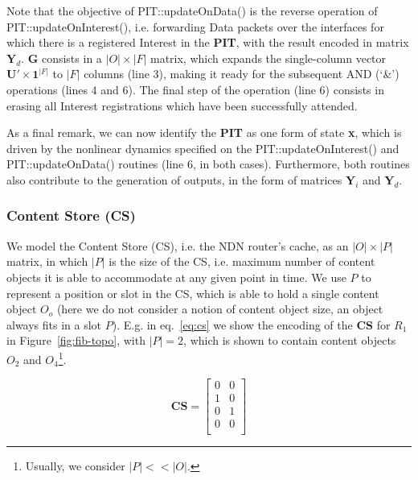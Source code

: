 Note that 
the objective of PIT::updateOnData() is the reverse operation of PIT::updateOnInterest(), i.e. forwarding Data 
packets over the interfaces for which there is a registered Interest in the \textbf{PIT}, with 
the result encoded in matrix $\textbf{Y}_d$. $\textbf{G}$ consists in a $|O| \times |F|$ matrix, which expands the single-column 
vector $\textbf{U}' \times \textbf{1}^{|F|}$ to $|F|$ columns (line 3), making it ready 
for the subsequent AND (`\&') operations (lines 4 and 6). The final 
step of the operation (line 6) consists in erasing 
all Interest registrations which have been successfully attended.\shortvertbreak

As a final remark, we can now identify the \textbf{PIT} as one form of state 
\textbf{x}, which is driven by the nonlinear dynamics specified on the 
PIT::updateOnInterest() and PIT::updateOnData() routines (line 6, in both cases). 
Furthermore, both routines also contribute to the generation of outputs, 
in the form of matrices $\textbf{Y}_i$ and $\textbf{Y}_d$.\shortvertbreak

\subsubsection{Content Store (CS)}
\label{subsec:meth-cs}

We model the Content Store (CS), i.e. the NDN router's cache, as an $|O| 
\times |P|$ matrix, in which $|P|$ is the size of the CS, i.e. maximum 
number of content objects it is able to accommodate at any given point in time. 
We use $P$ to represent a position or slot in the CS, which is able to hold a single 
content object $O_o$ (here we do not consider a notion of content object size, 
an object always fits in a slot $P$). E.g. in eq.~\ref{eq:cs} we show the encoding 
of the \textbf{CS} for $R_1$ in Figure~\ref{fig:fib-topo}, with $|P| = 2$, 
which is shown to contain content objects $O_2$ and $O_4$\footnote{Usually, 
we consider $|P| << |O|$.}.

\begin{equation}
\textbf{CS} = \begin{bmatrix} 0 & 0             \\ 
                1 & 0                           \\ 
                0 & 1                           \\ 
                0 & 0                           \\ \end{bmatrix}
    \label{eq:cs}
\end{equation}\shortvertbreak

